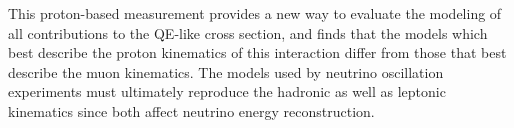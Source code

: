 This proton-based \xsecproton measurement provides a new way to evaluate the 
modeling of all contributions to the QE-like cross section, and finds that the 
models which best describe the proton kinematics of this interaction differ
from those that best describe the muon kinematics. The models used by 
neutrino oscillation experiments must ultimately reproduce the hadronic as well as 
leptonic kinematics since both affect neutrino energy reconstruction.


 




